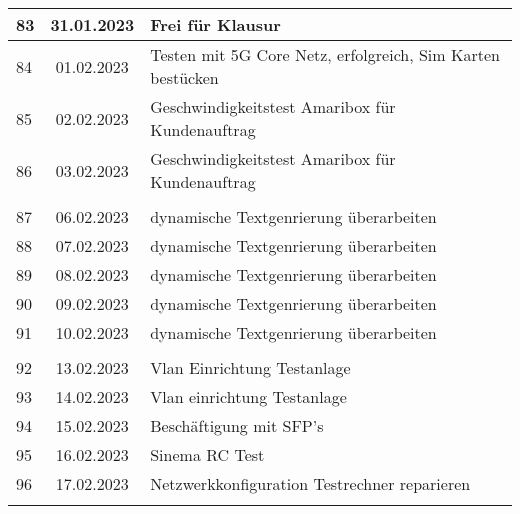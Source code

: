 \begin{longtable}{|l|c|l|}
83  & 31.01.2023    &  Frei für Klausur                                                       \\ \hline 
84  & 01.02.2023    &  Testen mit 5G Core Netz,  erfolgreich, Sim Karten bestücken                                                     \\ \hline 
85  & 02.02.2023    &  Geschwindigkeitstest Amaribox für Kundenauftrag                                                     \\ \hline 
86  & 03.02.2023    &  Geschwindigkeitstest Amaribox für Kundenauftrag                                                  \\ \hline
&               &                                                       \\ \hline  
87  & 06.02.2023    & dynamische Textgenrierung überarbeiten                 \\ \hline 
88  & 07.02.2023    & dynamische Textgenrierung überarbeiten                                                         \\ \hline 
89  & 08.02.2023    & dynamische Textgenrierung überarbeiten                                                         \\ \hline 
90  & 09.02.2023    &  dynamische Textgenrierung überarbeiten                                                        \\ \hline 
91  & 10.02.2023    &  dynamische Textgenrierung überarbeiten                                                        \\ \hline
&               &                                                       \\ \hline  
92  & 13.02.2023    &  Vlan Einrichtung Testanlage                                                     \\ \hline 
93  & 14.02.2023    &  Vlan einrichtung Testanlage                                                     \\ \hline 
94  & 15.02.2023    &  Beschäftigung mit SFP's                                                     \\ \hline 
95  & 16.02.2023    &  Sinema RC Test                                                    \\ \hline 
96  & 17.02.2023    &  Netzwerkkonfiguration Testrechner reparieren                                                     \\ \hline
&               &                                                       \\ \hline  

\end{longtable}
